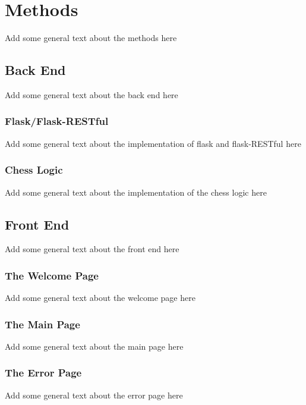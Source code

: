 \chapter{Methods}
\label{chapter2}

Add some general text about the methods here

\section{Back End}

Add some general text about the back end here

\subsection{Flask/Flask-RESTful}

Add some general text about the implementation of flask and flask-RESTful here

\subsection{Chess Logic}

Add some general text about the implementation of the chess logic here

\section{Front End}

Add some general text about the front end here

\subsection{The Welcome Page}

Add some general text about the welcome page here

\subsection{The Main Page}

Add some general text about the main page here

\subsection{The Error Page}

Add some general text about the error page here